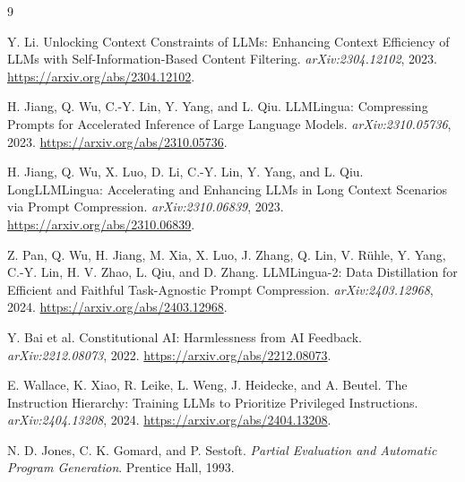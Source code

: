 \documentclass[11pt]{article}
\begin{document}
\begin{thebibliography}{9}

Y. Li.
\newblock Unlocking Context Constraints of LLMs: Enhancing Context Efficiency of LLMs with Self-Information-Based Content Filtering.
\newblock \emph{arXiv:2304.12102}, 2023.
\newblock \url{https://arxiv.org/abs/2304.12102}.

H. Jiang, Q. Wu, C.-Y. Lin, Y. Yang, and L. Qiu.
\newblock LLMLingua: Compressing Prompts for Accelerated Inference of Large Language Models.
\newblock \emph{arXiv:2310.05736}, 2023.
\newblock \url{https://arxiv.org/abs/2310.05736}.

H. Jiang, Q. Wu, X. Luo, D. Li, C.-Y. Lin, Y. Yang, and L. Qiu.
\newblock LongLLMLingua: Accelerating and Enhancing LLMs in Long Context Scenarios via Prompt Compression.
\newblock \emph{arXiv:2310.06839}, 2023.
\newblock \url{https://arxiv.org/abs/2310.06839}.

Z. Pan, Q. Wu, H. Jiang, M. Xia, X. Luo, J. Zhang, Q. Lin, V. R\"uhle, Y. Yang, C.-Y. Lin, H. V. Zhao, L. Qiu, and D. Zhang.
\newblock LLMLingua-2: Data Distillation for Efficient and Faithful Task-Agnostic Prompt Compression.
\newblock \emph{arXiv:2403.12968}, 2024.
\newblock \url{https://arxiv.org/abs/2403.12968}.

Y. Bai et al.
\newblock Constitutional AI: Harmlessness from AI Feedback.
\newblock \emph{arXiv:2212.08073}, 2022.
\newblock \url{https://arxiv.org/abs/2212.08073}.

E. Wallace, K. Xiao, R. Leike, L. Weng, J. Heidecke, and A. Beutel.
\newblock The Instruction Hierarchy: Training LLMs to Prioritize Privileged Instructions.
\newblock \emph{arXiv:2404.13208}, 2024.
\newblock \url{https://arxiv.org/abs/2404.13208}.

N. D. Jones, C. K. Gomard, and P. Sestoft.
\newblock \emph{Partial Evaluation and Automatic Program Generation}.
\newblock Prentice Hall, 1993.

\end{thebibliography}
\end{document}
